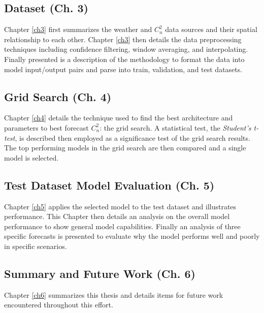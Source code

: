 \subsection{Dataset (Ch. 3)}
Chapter \ref{ch3} first summarizes the weather and $C_{n}^{2}$ data sources and their spatial relationship to each other. Chapter \ref{ch3} then details the data preprocessing techniques including confidence filtering, window averaging, and interpolating. Finally presented is a description of the methodology to format the data into model input/output pairs and parse into train, validation, and test datasets.

\subsection{Grid Search (Ch. 4)}
Chapter \ref{ch4} details the technique used to find the best architecture and parameters to best forecast $C_{n}^{2}$: the grid search. A statistical test, the \textit{Student's t-test}, is described then employed as a significance test of the grid search results. The top performing models in the grid search are then compared and a single model is selected.

\subsection{Test Dataset Model Evaluation (Ch. 5)}
Chapter \ref{ch5} applies the selected model to the test dataset and illustrates performance. This Chapter then details an analysis on the overall model performance to show general model capabilities. Finally an analysis of three specific forecasts is presented to evaluate why the model performs well and poorly in specific scenarios.

\subsection{Summary and Future Work (Ch. 6)}
Chapter \ref{ch6} summarizes this thesis and details items for future work encountered throughout this effort.